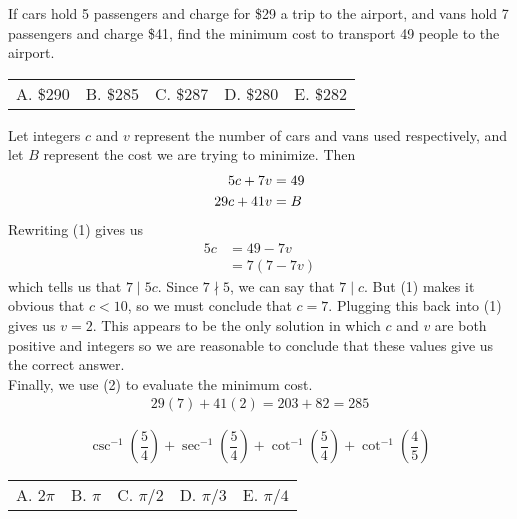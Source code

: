 \documentclass[12pt]{article}
\makeatletter
\newcounter{problem}
\newcommand{\multChoice}[5]{
    \begin{tabular}{l @{\hskip 1.5cm} l @{\hskip 1.5cm} l @{\hskip 1.5cm} l @{\hskip 1.5cm} l}
    A. #1 & B. #2 & C. #3 & D. #4 & E. #5
\end{tabular}

}
\makeatother
\begin{document}
\begin{problem}
   If cars hold 5 passengers and charge for \$29 a trip to the airport, and vans hold 7 passengers and charge \$41, find the minimum cost to transport 49 people to the airport. \\
   \multChoice{\$290}{\$285}{\$287}{\$280}{\$282}
\end{problem}

\begin{solution}[B. \$285]
   Let integers $c$ and $v$ represent the number of cars and vans used respectively, and let $B$ represent the cost we are trying to minimize. Then
   \begin{align} \setcounter{equation}{0}
       5c + 7v &= 49 \\
       29c + 41v &= B
   \end{align}
   Rewriting (1) gives us
   \begin{align*}
       5c &= 49 - 7v \\
       &= 7(7-7v)
   \end{align*}
   which tells us that $7 \mid 5c$. Since $7 \nmid 5$, we can say that $7 \mid c$. But (1) makes it obvious that $c < 10$, so we must conclude that $c=7$. Plugging this back into (1) gives us $v=2$. This appears to be the only solution in which $c$ and $v$ are both positive and integers so we are reasonable to conclude that these values give us the correct answer. \\[5pt] Finally, we use (2) to evaluate the minimum cost.
   \begin{align*}
       29(7) + 41(2) = 203 + 82 = \boxed{285}
   \end{align*}
\end{solution}

\begin{problem}
   $$ \csc^{-1}{\left(\frac{5}{4}\right)}+\sec^{-1}{\left(\frac{5}{4}\right)}+\cot^{-1}{\left(\frac{5}{4}\right)}+\cot^{-1}{\left(\frac{4}{5}\right)}$$
   \multChoice{$2\pi$}{$\pi$}{$\pi/2$}{$\pi/3$}{$\pi/4$}
\end{problem}
\end{document}
